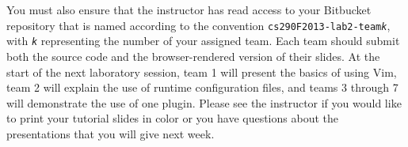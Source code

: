 You must also ensure that the instructor has read access to your Bitbucket repository that is named according to the
convention {\tt cs290F2013-lab2-team{\em k}}, with {\tt {\em k}} representing the number of your assigned team. 
Each team should submit both the source code and the browser-rendered version of their slides.  At the start of the next
laboratory session, team 1 will present the basics of using Vim, team 2 will explain the use of runtime configuration
files, and teams 3 through 7 will demonstrate the use of one plugin.  Please see the instructor if you would like to
print your tutorial slides in color or you have questions about the presentations that you will give next week.


